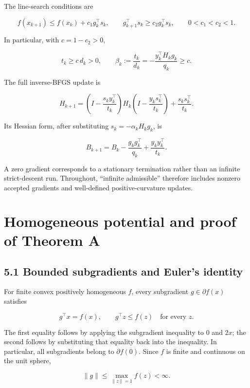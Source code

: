 \documentclass[10pt,oneside,openany]{book}
\theoremstyle{remark}\newtheorem{remark}{Remark}[chapter]
\begin{document}
The line-search conditions are

\[
f(x_{k+1})\le f(x_k)+c_1g_k^\top s_k,
\qquad
g_{k+1}^\top s_k\ge c_2g_k^\top s_k,
\qquad0<c_1<c_2<1.
\]

In particular, with \(c=1-c_2>0\),

\[
t_k\ge c\,d_k>0,
\qquad
\beta_k:=\frac{t_k}{d_k}
=-\frac{y_k^\top H_kg_k}{q_k}\ge c.
\]

The full inverse-BFGS update is

\[
H_{k+1}=
\left(I-\frac{s_ky_k^\top}{t_k}\right)
H_k
\left(I-\frac{y_ks_k^\top}{t_k}\right)
+\frac{s_ks_k^\top}{t_k}.
\]

Its Hessian form, after substituting \(s_k=-\alpha_kH_kg_k\), is

\[
\boxed{B_{k+1}=B_k-\frac{g_kg_k^\top}{q_k}
+\frac{y_ky_k^\top}{t_k}.}
\tag{H.2.1}
\]

A zero gradient corresponds to a stationary termination rather than an
infinite strict-descent run. Throughout, ``infinite admissible''
therefore includes nonzero accepted gradients and well-defined
positive-curvature updates.



\setcounter{section}{4}
\setcounter{theorem}{0}
\setcounter{lemma}{0}
\setcounter{corollary}{0}
\setcounter{proposition}{0}
\setcounter{remark}{0}
\setcounter{equation}{0}
\section{Homogeneous potential and proof of Theorem
A}\label{H:homogeneous-potential-and-proof-of-theorem-a}

\subsection{5.1 Bounded subgradients and Euler's
identity}\label{H:bounded-subgradients-and-eulers-identity}

For finite convex positively homogeneous \(f\), every subgradient
\(g\in\partial f(x)\) satisfies

\[
g^\top x=f(x),\qquad g^\top z\le f(z)\quad\text{for every }z.
\]

The first equality follows by applying the subgradient inequality to
\(0\) and \(2x\); the second follows by substituting that equality back
into the inequality. In particular, all subgradients belong to
\(\partial f(0)\). Since \(f\) is finite and continuous on the unit
sphere,

\[
\|g\|\le\max_{\|z\|=1}f(z)<\infty.
\]
\end{document}
